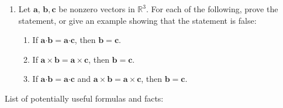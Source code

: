 \documentclass[12pt]{article}
\newcommand{\points}[1]{\marginpar{\hspace{24pt}[#1]}}
\newcommand{\R}{\mathbb{R}}
\newcommand{\aaa}{\mathbf{a}}
\newcommand{\bbb}{\mathbf{b}}
\newcommand{\ccc}{\mathbf{c}}
\newcommand{\dotp}{\boldsymbol{\cdot}}
\begin{document}
\begin{enumerate}
\vspace{3in}




\item Let $\mathbf{a},\,\mathbf{b},\mathbf{c}$ be nonzero vectors in $\R^3$. For each of the following, prove the statement, or give an example showing that the statement is false: \points{6}
\begin{enumerate}
\item If $\aaa\dotp\bbb = \aaa\dotp\ccc$, then $\bbb=\ccc$.
\item If $\aaa\times\bbb = \aaa\times\ccc$, then $\bbb=\ccc$.
\item If $\aaa\dotp\bbb = \aaa\dotp\ccc$ and $\aaa\times\bbb = \aaa\times\ccc$, then $\bbb=\ccc$.

\end{enumerate}


\end{enumerate}
\newpage

\begin{center}
List of potentially useful formulas and facts:
\end{center}
\end{document}
